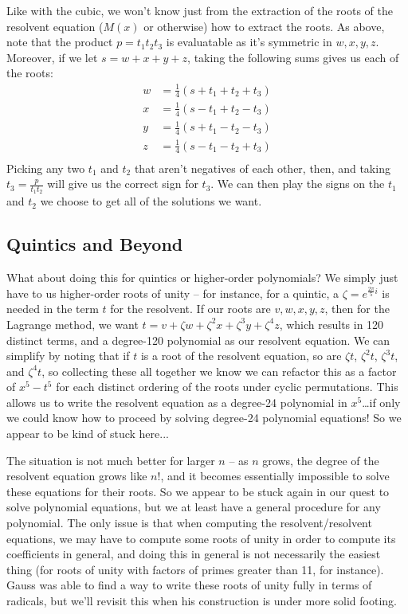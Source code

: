 \documentclass[12pt]{scrartcl}
\begin{document}
Like with the cubic, we won't know just from the extraction of the roots of the resolvent equation ($M(x)$ or otherwise) how to extract the roots. As above, note that the product $p = t_1 t_2 t_3$ is evaluatable as it's symmetric in $w, x, y, z$. Moreover, if we let $s = w + x + y + z$, taking the following sums gives us each of the roots: 
\begin{align*}
    w &= \frac 14 (s + t_1 + t_2 + t_3) \\ 
    x &= \frac 14 (s - t_1 + t_2 - t_3) \\ 
    y &= \frac 14 (s + t_1 - t_2 - t_3) \\ 
    z &= \frac 14 (s - t_1 - t_2 + t_3) \\ 
\end{align*}
Picking any two $t_1$ and $t_2$ that aren't negatives of each other, then, and taking $t_3 = \frac p {t_1 t_2}$ will give us the correct sign for $t_3$. We can then play the signs on the $t_1$ and $t_2$ we choose to get all of the solutions we want. 

\subsection{Quintics and Beyond}
What about doing this for quintics or higher-order polynomials? We simply just have to us higher-order roots of unity -- for instance, for a quintic, a $\zeta = e^{\frac{2\pi}5 i}$ is needed in the term $t$ for the resolvent. If our roots are $v, w, x, y, z$, then for the Lagrange method, we want $t = v + \zeta w + \zeta^2 x + \zeta^3 y + \zeta^4 z$, which results in 120 distinct terms, and a degree-120 polynomial as our resolvent equation. We can simplify by noting that if $t$ is a root of the resolvent equation, so are $\zeta t$, $\zeta^2 t$, $\zeta^3 t$, and $\zeta^4 t$, so collecting these all together we know we can refactor this as a factor of $x^5 - t^5$ for each distinct ordering of the roots under cyclic permutations. This allows us to write the resolvent equation as a degree-24 polynomial in $x^5$\dots if only we could know how to proceed by solving degree-24 polynomial equations! So we appear to be kind of stuck here...

The situation is not much better for larger $n$ -- as $n$ grows, the degree of the resolvent equation grows like $n!$, and it becomes essentially impossible to solve these equations for their roots. So we appear to be stuck again in our quest to solve polynomial equations, but we at least have a general procedure for any polynomial. The only issue is that when computing the resolvent/resolvent equations, we may have to compute some roots of unity in order to compute its coefficients in general, and doing this in general is not necessarily the easiest thing (for roots of unity with factors of primes greater than 11, for instance). Gauss was able to find a way to write these roots of unity fully in terms of radicals, but we'll revisit this when his construction is under more solid footing. 
\end{document}
